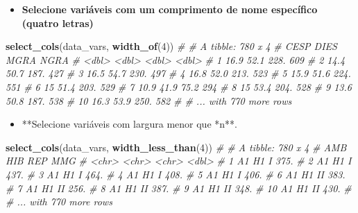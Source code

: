 \documentclass[
]{book}
\newenvironment{Shaded}{\begin{snugshade}}{\end{snugshade}}
\newcommand{\CommentTok}[1]{\textcolor[rgb]{0.56,0.35,0.01}{\textit{#1}}}
\newcommand{\DecValTok}[1]{\textcolor[rgb]{0.00,0.00,0.81}{#1}}
\newcommand{\KeywordTok}[1]{\textcolor[rgb]{0.13,0.29,0.53}{\textbf{#1}}}
\newcommand{\NormalTok}[1]{#1}
\providecommand{\tightlist}{%
  \setlength{\itemsep}{0pt}\setlength{\parskip}{0pt}}
\begin{document}
\begin{itemize}
\tightlist
\item
  \textbf{Selecione variáveis com um comprimento de nome específico (quatro letras)}
\end{itemize}


\begin{Shaded}
\begin{Highlighting}[]
\KeywordTok{select_cols}\NormalTok{(data_vars, }\KeywordTok{width_of}\NormalTok{(}\DecValTok{4}\NormalTok{))}
\CommentTok{# # A tibble: 780 x 4}
\CommentTok{#     CESP  DIES  MGRA  NGRA}
\CommentTok{#    <dbl> <dbl> <dbl> <dbl>}
\CommentTok{#  1  16.9  52.1 228.    609}
\CommentTok{#  2  14.4  50.7 187.    427}
\CommentTok{#  3  16.5  54.7 230.    497}
\CommentTok{#  4  16.8  52.0 213.    523}
\CommentTok{#  5  15.9  51.6 224.    551}
\CommentTok{#  6  15    51.4 203.    529}
\CommentTok{#  7  10.9  41.9  75.2   294}
\CommentTok{#  8  15    53.4 204.    528}
\CommentTok{#  9  13.6  50.8 187.    538}
\CommentTok{# 10  16.3  53.9 250.    582}
\CommentTok{# # ... with 770 more rows}
\end{Highlighting}
\end{Shaded}

\begin{itemize}
\tightlist
\item
  **Selecione variáveis com largura menor que *n**.
\end{itemize}


\begin{Shaded}
\begin{Highlighting}[]
\KeywordTok{select_cols}\NormalTok{(data_vars, }\KeywordTok{width_less_than}\NormalTok{(}\DecValTok{4}\NormalTok{))}
\CommentTok{# # A tibble: 780 x 4}
\CommentTok{#    AMB   HIB   REP     MMG}
\CommentTok{#    <chr> <chr> <chr> <dbl>}
\CommentTok{#  1 A1    H1    I      375.}
\CommentTok{#  2 A1    H1    I      437.}
\CommentTok{#  3 A1    H1    I      464.}
\CommentTok{#  4 A1    H1    I      408.}
\CommentTok{#  5 A1    H1    I      406.}
\CommentTok{#  6 A1    H1    II     383.}
\CommentTok{#  7 A1    H1    II     256.}
\CommentTok{#  8 A1    H1    II     387.}
\CommentTok{#  9 A1    H1    II     348.}
\CommentTok{# 10 A1    H1    II     430.}
\CommentTok{# # ... with 770 more rows}
\end{Highlighting}
\end{Shaded}
\end{document}
